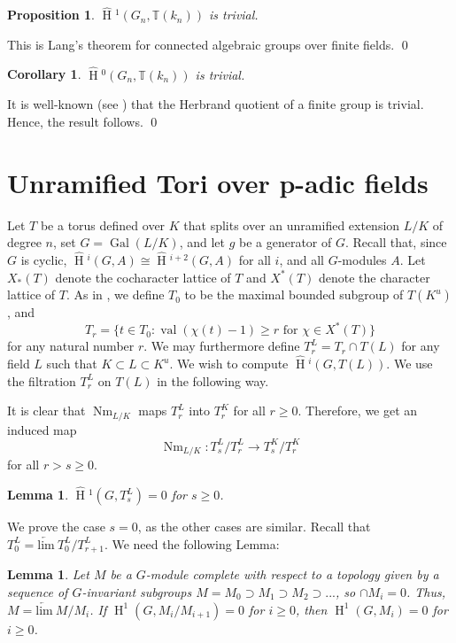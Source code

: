 \documentclass[11pt]{amsart}
\theoremstyle{plain}
\newtheorem{proposition}[theorem]{Proposition}
\newtheorem{corollary}[theorem]{Corollary}
\newtheorem{lemma}[theorem]{Lemma}
\newcommand{\HT}[1]{\hat{\HH}{}^{#1}}
\theoremstyle{definition}
\DeclareMathOperator{\Gal}{Gal}
\DeclareMathOperator{\val}{val}
\DeclareMathOperator{\HH}{H}
\DeclareMathOperator{\Nm}{Nm}
\begin{document}
\begin{proposition}\label{trivialH1finitefields}
$\HT{1}(G_n,\mathbb{T}(k_n))$ is trivial.
\end{proposition}

\proof
This is Lang's theorem for connected algebraic groups over finite fields.
\qed

\begin{corollary}
$\HT{0}(G_n,\mathbb{T}(k_n))$ is trivial.
\end{corollary}

\proof
It is well-known (see \cite[p. 134]{serre}) that the Herbrand quotient 
of a finite group is trivial.  Hence, the result follows.
\qed

\section{Unramified Tori over p-adic fields}

Let $T$ be a torus defined over $K$ that splits over an unramified
extension $L/K$ of degree $n$, set $G = \Gal(L/K)$, and let $g$ be a
generator of $G$.  Recall that, since $G$ is cyclic,
$\HT{i}(G,A)\cong \HT{i+2}(G,A)$ for all $i$, and all
$G$-modules $A$.  Let $X_*(T)$ denote the cocharacter lattice of $T$ and
$X^*(T)$ denote the character lattice of $T$.  As in \cite[Section 3]{moyprasad1},
we define $T_0$ to be the maximal bounded subgroup of
$T(K^u)$, and
$$T_r = \{t \in T_0 : \val(\chi(t) - 1) \geq r \mbox{ for } \chi \in X^*(T) \}$$
for any natural number $r$.  We may
furthermore define $T_r^L = T_r \cap T(L)$ for any field $L$ such
that $K \subset L \subset K^u$.  We wish to compute $\HT{i}(G, T(L))$.
We use the filtration $T_r^L$ on $T(L)$ in the following way.

It is clear that $\Nm_{L/K}$ maps $T_r^L$ into $T_r^K$ for all $r \geq 0$.
Therefore, we get an induced map
$$\Nm_{L/K} : T_s^L / T_{r}^L \rightarrow T_s^K / T_{r}^K$$
for all $r > s \geq 0$.

\begin{lemma}\label{H1compactpart}
$\HT{1}(G, T_{s}^L) = 0$ for $s \geq 0$.
\end{lemma}

\proof
We prove the case $s = 0$, as the other cases are similar.  Recall
that $T_0^L = \underleftarrow{\mathrm{lim}} \ T_0^L / T_{r+1}^L$.  We
need the following Lemma:

\begin{lemma}\label{abstractcohomology}
  Let $M$ be a $G$-module complete with respect to a topology given by
  a sequence of $G$-invariant subgroups $M = M_0 \supset M_1 \supset
  M_2 \supset ...$, so $\cap M_i = 0$.  Thus,
  $M = \underleftarrow{\mathrm{lim}} \ M / M_i$.
  If $\HH^1(G, M_i / M_{i+1}) = 0$ for $i \geq 0$,
  then $\HH^1(G, M_i) = 0$ for $i \geq 0$.
\end{lemma}
\end{document}
